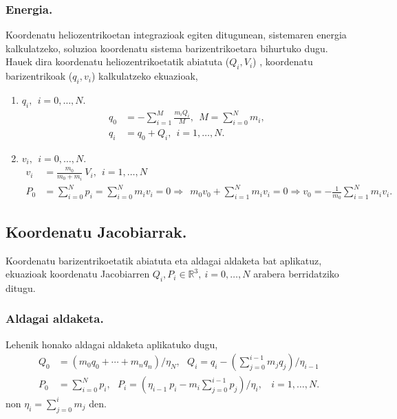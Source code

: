 \subsubsection*{Energia.}

Koordenatu heliozentrikoetan integrazioak egiten ditugunean, sistemaren energia kalkulatzeko, soluzioa koordenatu sistema barizentrikoetara bihurtuko dugu. Hauek dira koordenatu heliozentrikoetatik abiatuta ($Q_i,V_i$) , koordenatu barizentrikoak ($q_i,v_i$) kalkulatzeko ekuazioak,

\begin{enumerate}
\item $q_i, \ \ i=0,\dots,N$. 
\begin{align*}
q_0 &=-\sum\limits_{i=1}^{M} \frac{m_i Q_i}{M}, \ \ M= \sum\limits_{i=0}^{N} m_i, \\
q_i &=q_0+Q_i, \ \ i=1,\dots,N.
\end{align*}

\item $v_i, \ \ i=0,\dots,N$. 
\begin{align*}
v_i &=\frac{m_0}{m_0+m_i} \ V_i, \ \ i=1,\dots,N \\
P_0 &=\sum\limits_{i=0}^{N} p_i=\sum\limits_{i=0}^{N} m_i v_i=0 \Rightarrow \ \  m_0v_0+ \sum\limits_{i=1}^{N} m_i v_i=0 \Rightarrow v_0=-\frac{1}{m_0} \sum\limits_{i=1}^{N} m_i v_i. 
\end{align*}

\end{enumerate}


\subsection*{Koordenatu Jacobiarrak.}

Koordenatu barizentrikoetatik abiatuta eta aldagai aldaketa bat aplikatuz, ekuazioak koordenatu Jacobiarren  $Q_i,P_i \in \mathbb{R}^3, \ i=0,\dots,N$ arabera berridatziko ditugu. 

\subsubsection*{Aldagai aldaketa.}
Lehenik honako aldagai aldaketa aplikatuko dugu,
\begin{align*}
Q_0 &=(m_0 q_0+\cdots+m_n q_n)/\eta_N,\ \ \ Q_i  =q_i-\left(\sum_{j=0}^{i-1}m_j q_j \right)/\eta_{i-1} \\
P_0 &=\sum\limits_{i=0}^{N}p_i, \ \ \ P_i =\left(\eta_{i-1} \ p_i- m_i \sum_{j=0}^{i-1} p_j\right)/\eta_i, \ \ \ \ i=1,\dots{,N}.
\end{align*}
non $\eta_i=\sum_{j=0}^{i} m_j$ den.

